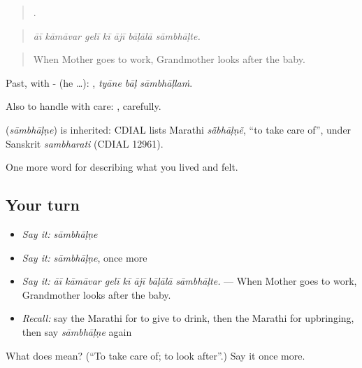\begin{quote}
      .
\end{quote}

\begin{quote}
\emph{āī kāmāvar gelī kī ājī bāḷālā sāmbhāḷte.}
\end{quote}

\begin{quote}
When Mother goes to work, Grandmother looks after the baby.
\end{quote}

Past, with - (he …):   , \emph{tyāne bāḷ sāmbhāḷlaṁ}.

Also to handle with care: , carefully.

\begin{cousinweb}
\textbf{} (\emph{sāmbhāḷṇe}) is inherited: CDIAL lists Marathi \emph{sā̃bhāḷṇẽ}, \textquotedblleft{}to take care of\textquotedblright{}, under Sanskrit \emph{sambharati} (CDIAL 12961).
\end{cousinweb}

\begin{grammarlens}[title={What you've built}]
One more word for describing what you lived and felt.
\end{grammarlens}

\subsection*{Your turn}
\begin{itemize}
\raggedright
  \item \emph{Say it:} \emph{sāmbhāḷṇe}
  \item \emph{Say it:} \emph{sāmbhāḷṇe}, once more
  \item \emph{Say it:} \emph{āī kāmāvar gelī kī ājī bāḷālā sāmbhāḷte.} — When Mother goes to work, Grandmother looks after the baby.
  \item \emph{Recall:} say the Marathi for to give to drink, then the Marathi for upbringing, then say \emph{sāmbhāḷṇe} again
\end{itemize}

\begin{tcolorbox}[breakable,colback=teal!4,colframe=teal!35!black,title={Before you move on}]
What does  mean? (\textquotedblleft{}To take care of; to look after\textquotedblright{}.) Say it once more.
\end{tcolorbox}
